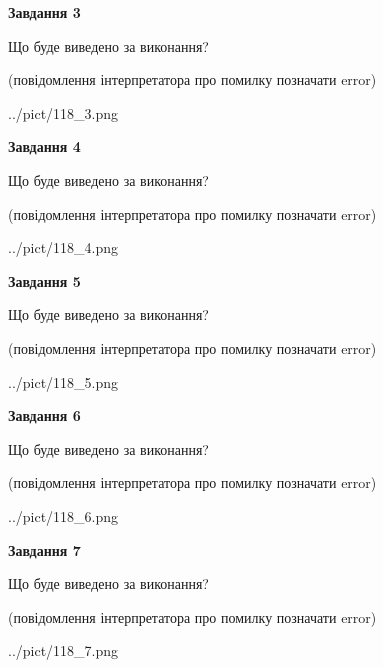 \documentclass[12pt, ukrainian]{article}
\begin{document}
{\begin {large}
{\begin {center}\textbf{Завдання 3}\end {center}}\par
Що буде виведено за виконання?\par
 (повідомлення інтерпретатора про помилку позначати error)\par
\begin{center}
	{../pict/118_3.png}
\end{center}
\newpage

{\begin {center}\textbf{Завдання 4}\end {center}}\par
Що буде виведено за виконання?\par
 (повідомлення інтерпретатора про помилку позначати error)\par
\begin{center}
	{../pict/118_4.png}
\end{center}
\newpage

{\begin {center}\textbf{Завдання 5}\end {center}}\par
Що буде виведено за виконання?\par
 (повідомлення інтерпретатора про помилку позначати error)\par
\begin{center}
	{../pict/118_5.png}
\end{center}
\newpage

{\begin {center}\textbf{Завдання 6}\end {center}}\par
Що буде виведено за виконання?\par
 (повідомлення інтерпретатора про помилку позначати error)\par
\begin{center}
	{../pict/118_6.png}
\end{center}
\newpage

{\begin {center}\textbf{Завдання 7}\end {center}}\par
Що буде виведено за виконання?\par
 (повідомлення інтерпретатора про помилку позначати error)\par
\begin{center}
	{../pict/118_7.png}
\end{center}
\newpage


\end{large}}
\end{document}
